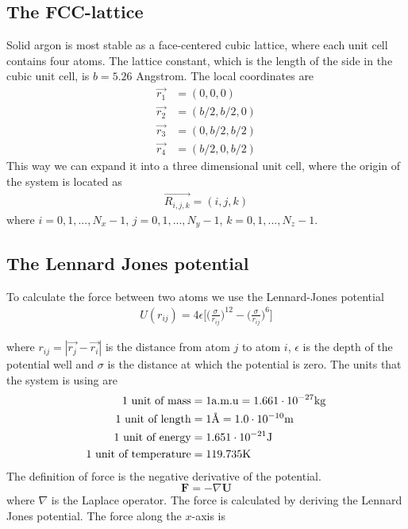 \documentclass{article}
\begin{document}
\subsection{The FCC-lattice}

Solid argon is most stable as a face-centered cubic lattice, where each unit cell contains four atoms. The lattice constant, which is the length of the side in the cubic unit cell, is $b=5.26$ Angstrom. The local coordinates are
\begin{align*}
	\vec{r_1} &= (0,0,0)\\
	\vec{r_2} &= (b/2,b/2,0)\\
	\vec{r_3} &= (0,b/2,b/2)\\
	\vec{r_4} &= (b/2,0,b/2)
\end{align*}
This way we can expand it into a three dimensional unit cell, where the origin of the system is located as
\begin{align*}
	\vec{R_{i,j,k}}=(i,j,k)
\end{align*}
where $i=0,1,...,N_x-1$, $j=0,1,...,N_y-1$, $k=0,1,...,N_z-1$.
\subsection{The Lennard Jones potential}

To calculate the force between two atoms we use the Lennard-Jones potential
\begin{align}
	U(r_{ij})=4\epsilon\Big[\Big(\frac{\sigma}{r_{ij}}\Big)^{12}-\Big(\frac{\sigma}{r_{ij}}\Big)^{6}\Big]
\end{align}

where $r_{ij}=|\vec{r_j}-\vec{r_i}|$ is the distance from atom $j$ to atom $i$, $\epsilon$ is the depth of the potential well and $\sigma$ is the distance at which the potential is zero. The units that the system is using are
\begin{align*}
	1 \textnormal{ unit of mass} &= 1 \textnormal{a.m.u} = 1.661\cdot 10^{-27} \textnormal{kg}\\
	1 \textnormal{ unit of length} &= 1 \textnormal{Å} = 1.0\cdot 10^{-10} \textnormal{m}\\
	1 \textnormal{ unit of energy} &= 1.651\cdot 10^{-21}\textnormal{J}\\
	1 \textnormal{ unit of temperature} &= 119.735\textnormal{K}
\end{align*}
The definition of force is the negative derivative of the potential.
$$\mathbf{F}=-\nabla \mathbf{U}$$
where $\nabla$ is the Laplace operator.
The force is calculated by deriving the Lennard Jones potential. The force along the $x$-axis is
\end{document}
